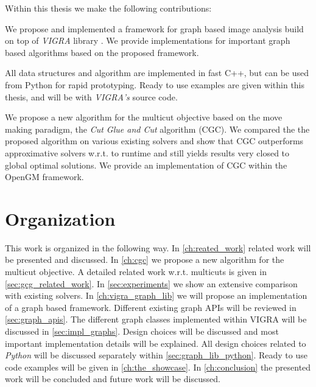 Within this thesis we make the following contributions:

\begin{compactitem}
    \item We propose and implemented a framework for graph based image analysis 
        build on top of  \emph{VIGRA} library \cite{koethe_2000_phd_thesis,software_vigra}. We provide implementations for important graph based algorithms based on the proposed framework.

        All data structures and algorithm are implemented in fast C++, 
        but can be used from Python for rapid prototyping.
        Ready to use examples are given within this thesis, and will be 
        with \emph{VIGRA's} source code.



    \item 
        We propose a new algorithm for the multicut objective based on the move
        making paradigm, the \emph{Cut Glue and Cut} algorithm (CGC). We compared the 
        the proposed algorithm on various existing solvers and show
        that CGC outperforms approximative solvers w.r.t. to runtime and still yields
        results very closed to global optimal solutions. We provide an implementation of CGC within the OpenGM framework.



\end{compactitem}


\section{Organization}

This work is organized in the following way.
In \cref{ch:reated_work} related work will be presented and  discussed.
In \cref{ch:cgc} we propose a new algorithm for the multicut objective.
A detailed related work w.r.t. multicuts is given in \cref{sec:gcg_related_work}.
In \cref{sec:experiments} we show an extensive comparison  with existing solvers.
In \cref{ch:vigra_graph_lib} we will propose an implementation of
a graph based framework. 
Different existing graph APIs will be reviewed in \cref{sec:graph_apis}.
The different graph classes implemented within VIGRA
will be discussed in \cref{sec:impl_graphs}.
Design choices will be discussed and most 
important implementation details will be explained.
All design choices related to \emph{Python} will
be discussed separately within \cref{sec:graph_lib_python}.
Ready to use code examples will be given in \cref{ch:the_showcase}.
In \cref{ch:conclusion} the presented work will be concluded
and future work will be discussed.





